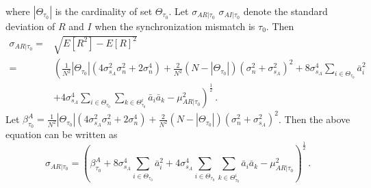 where $|\Theta_{\tau_0}|$ is the cardinality of set $\Theta_{\tau_0}$. 
Let $\sigma_{AR|\tau_0}$ $\sigma_{AI|\tau_0}$ denote the standard deviation of $R$ and $I$ when the synchronization mismatch is $\tau_0$. Then 
\begin{equation}
  \begin{split}
	\sigma_{AR|\tau_0} = &\sqrt{E[R^2] - E[R]^2}\\
	= &\left(\frac{1}{N^2}|\Theta_{\tau_0}|(4\sigma_{s_A}^2\sigma_n^2+2\sigma_n^4) + \frac{2}{N^2}(N - |\Theta_{\tau_0}|)(\sigma_n^2+\sigma_{s_A}^2)^2 +  8\sigma_{s_A}^4\sum_{i\in\Theta_{\tau_0}}\bar{a}_i^2 \right.\\
  &\left.+ 4\sigma_{s_A}^4\sum_{i\in\Theta_{\tau_0}}\sum_{k\in\Theta_{\tau_0}^i}\bar{a}_i\bar{a}_k- \mu_{AR|\tau_0}^2\right)^\frac{1}{2}\,.
  \end{split}
  \label{deviationR}
\end{equation}
Let $\beta_{\tau_0}^A = \frac{1}{N^2}|\Theta_{\tau_0}|(4\sigma_{s_A}^2\sigma_n^2+2\sigma_n^4) + \frac{2}{N^2}(N - |\Theta_{\tau_0}|)(\sigma_n^2+\sigma_{s_A}^2)^2$. Then the above equation can be written as
\begin{equation}
  \sigma_{AR|\tau_0} = \left(\beta_{\tau_0}^A+  8\sigma_{s_A}^4\sum_{i\in\Theta_{\tau_0}}\bar{a}_i^2 
    + 4\sigma_{s_A}^4\sum_{i\in\Theta_{\tau_0}}\sum_{k\in\Theta_{\tau_0}^i}\bar{a}_i\bar{a}_k- \mu_{AR|\tau_0}^2\right)^\frac{1}{2}\,.
  \label{devR}
\end{equation}

